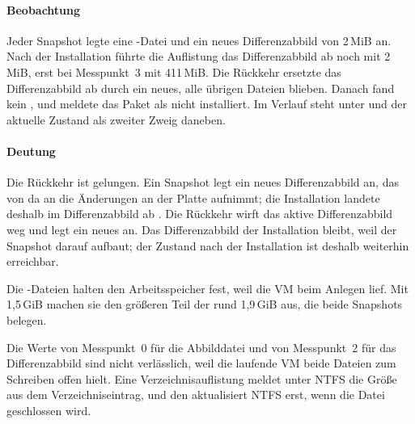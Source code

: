 \begin{messung}








\paragraph{Beobachtung} Jeder Snapshot legte eine -Datei und ein neues Differenzabbild von 2\,MiB an. Nach der Installation führte die Auflistung das Differenzabbild ab  noch mit 2\,MiB, erst bei Messpunkt~3 mit 411\,MiB. Die Rückkehr ersetzte das Differenzabbild ab  durch ein neues, alle übrigen Dateien blieben. Danach fand  kein , und  meldete das Paket als nicht installiert. Im Verlauf steht  unter  und der aktuelle Zustand als zweiter Zweig daneben.

\paragraph{Deutung} Die Rückkehr ist gelungen. Ein Snapshot legt ein neues Differenzabbild an, das von da an die Änderungen an der Platte aufnimmt; die Installation landete deshalb im Differenzabbild ab . Die Rückkehr wirft das aktive Differenzabbild weg und legt ein neues an. Das Differenzabbild der Installation bleibt, weil der Snapshot  darauf aufbaut; der Zustand nach der Installation ist deshalb weiterhin erreichbar.

Die -Dateien halten den Arbeitsspeicher fest, weil die VM beim Anlegen lief. Mit 1,5\,GiB machen sie den größeren Teil der rund 1,9\,GiB aus, die beide Snapshots belegen.

Die Werte von Messpunkt~0 für die Abbilddatei und von Messpunkt~2 für das Differenzabbild sind nicht verlässlich, weil die laufende VM beide Dateien zum Schreiben offen hielt. Eine Verzeichnisauflistung meldet unter NTFS die Größe aus dem Verzeichniseintrag, und den aktualisiert NTFS erst, wenn die Datei geschlossen wird.
\end{messung}

